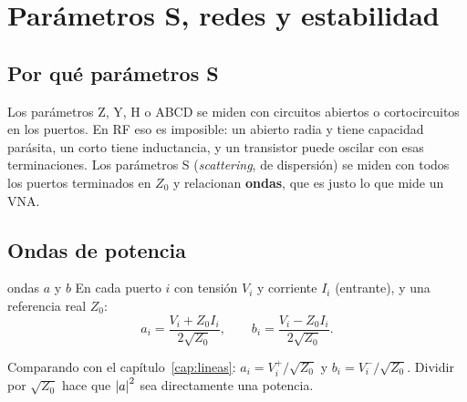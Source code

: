 \chapter{Parámetros S, redes y estabilidad}\label{cap:sparams}

\section{Por qué parámetros S}

Los parámetros Z, Y, H o ABCD se miden con circuitos abiertos o cortocircuitos en los puertos. En RF eso es imposible: un abierto
radia y tiene capacidad parásita, un corto tiene inductancia, y un transistor puede oscilar con esas terminaciones. Los parámetros S
(\emph{scattering}, de dispersión) se miden con todos los puertos terminados en $Z_0$ y relacionan \textbf{ondas}, que es justo lo que mide un VNA.

\section{Ondas de potencia}
\begin{definicion}{ondas $a$ y $b$}
En cada puerto $i$ con tensión $V_i$ y corriente $I_i$ (entrante), y una referencia real $Z_0$:
\begin{equation}
  a_i = \frac{V_i + Z_0 I_i}{2\sqrt{Z_0}}, \qquad b_i = \frac{V_i - Z_0 I_i}{2\sqrt{Z_0}} .
\end{equation}
\begin{donde}
\end{donde}
\end{definicion}
Comparando con el capítulo~\ref{cap:lineas}: $a_i = V_i^+/\sqrt{Z_0}$ y $b_i = V_i^-/\sqrt{Z_0}$. Dividir por $\sqrt{Z_0}$ hace que
$\left|a\right|^2$ sea directamente una potencia.

